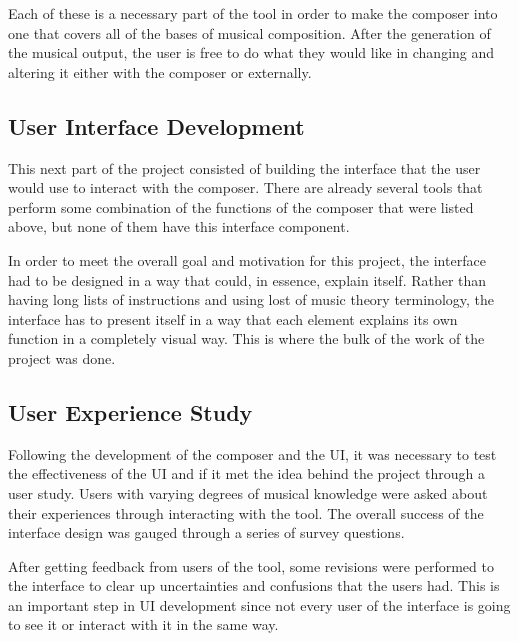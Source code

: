 \vspace{\baselineskip}

Each of these is a necessary part of the tool in order to make the composer into one that covers all of the bases of musical composition.  After the generation of the musical output, the user is free to do what they would like in changing and altering it either with the composer or externally.

\subsection{User Interface Development}
\label{subsec:userinterfacedevelopment}

This next part of the project consisted of building the interface that the user would use to interact with the composer.  There are already several tools that perform some combination of the functions of the composer that were listed above, but none of them have this interface component.

\vspace{\baselineskip}

In order to meet the overall goal and motivation for this project, the interface had to be designed in a way that could, in essence, explain itself.  Rather than having long lists of instructions and using lost of music theory terminology, the interface has to present itself in a way that each element explains its own function in a completely visual way.  This is where the bulk of the work of the project was done.

\subsection{User Experience Study}
\label{subsec:userexperiencestudy}

Following the development of the composer and the UI, it was necessary to test the effectiveness of the UI and if it met the idea behind the project through a user study.   Users with varying degrees of musical knowledge were asked about their experiences through interacting with the tool.  The overall success of the interface design was gauged through a series of survey questions.

\vspace{\baselineskip}

After getting feedback from users of the tool, some revisions were performed to the interface to clear up uncertainties and confusions that the users had.  This is an important step in UI development since not every user of the interface is going to see it or interact with it in the same way.

